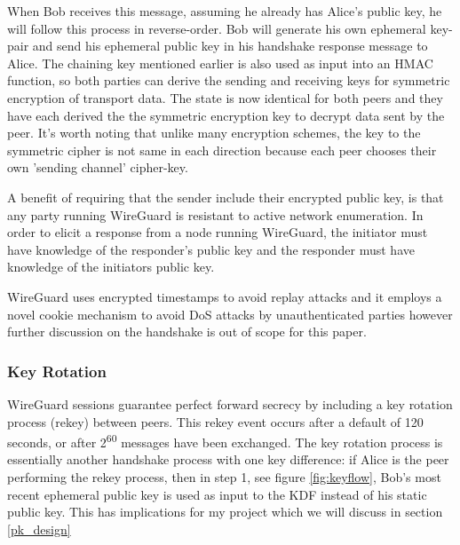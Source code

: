 \documentclass [11pt, proquest] {uwthesis}[2020/02/24]
\begin{document}
When Bob receives this message, assuming he already has Alice's public key, he will follow this process in reverse-order. Bob will generate his own ephemeral key-pair and send his ephemeral public key in his handshake response message to Alice. The chaining key mentioned earlier is also used as input into an HMAC function, so both parties can derive the sending and receiving keys for symmetric encryption of transport data.
The state is now identical for both peers and they have each derived the the symmetric encryption key to decrypt data sent by the peer. It's worth noting that unlike many encryption schemes, the key to the symmetric cipher is not same in each direction because each peer chooses their own 'sending channel' cipher-key.

A benefit of requiring that the sender include their encrypted public key, is that any party running WireGuard is resistant to active network enumeration. In order to elicit a response from a node running WireGuard, the initiator must have knowledge of the responder's public key and the responder must have knowledge of the initiators public key.

WireGuard uses encrypted timestamps to avoid replay attacks and it employs a novel cookie mechanism to avoid DoS attacks by unauthenticated parties however further discussion on the handshake is out of scope for this paper.

\subsubsection{Key Rotation}
\label{keyrotate}
WireGuard sessions guarantee perfect forward secrecy by including a key rotation process (rekey) between peers. This rekey event occurs after a default of 120 seconds, or after 2\textsuperscript{60} messages have been exchanged. The key rotation process is essentially another handshake process with one key difference: if Alice is the peer performing the rekey process, then in step 1, see figure \ref{fig:keyflow}, Bob's most recent ephemeral public key is used as input to the KDF instead of his static public key. This has implications for my project which we will discuss in section \ref{pk_design}
\end{document}
